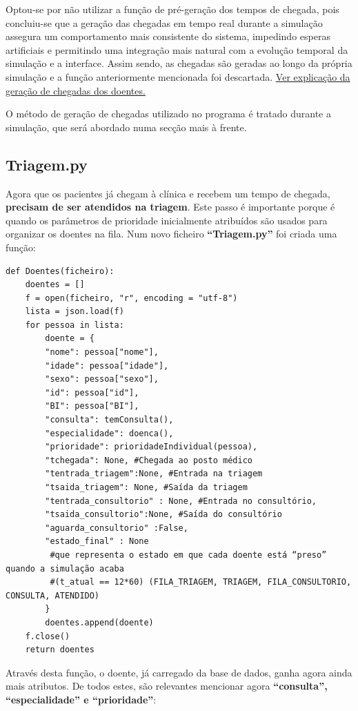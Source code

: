 \documentclass[12pt,a4paper]{article} %
\begin{document}
    \medskip
    Optou-se por não utilizar a função de pré-geração dos tempos de chegada, pois concluiu-se que a geração das chegadas em tempo real durante a simulação assegura um comportamento mais consistente do sistema, impedindo esperas artificiais e permitindo uma integração mais natural com a evolução temporal da simulação e a interface. Assim sendo, as chegadas são geradas ao longo da própria simulação e a função anteriormente mencionada foi descartada.  \hyperlink{geracao_chegadas}{Ver explicação da geração de chegadas dos doentes.}

    \medskip
    O método de geração de chegadas utilizado no programa é tratado durante a simulação, que será abordado numa secção mais à frente.
    
    \subsection{Triagem.py}
    
        Agora que os pacientes já chegam à clínica e recebem um tempo de chegada, \textbf{precisam de ser atendidos na triagem}. Este passo é importante porque é quando os parâmetros de prioridade inicialmente atribuídos são usados para organizar os doentes na fila. Num novo ficheiro \textbf{“Triagem.py”} foi criada uma função: 
        
\begin{verbatim}
def Doentes(ficheiro):
    doentes = []
    f = open(ficheiro, "r", encoding = "utf-8")
    lista = json.load(f)
    for pessoa in lista:
        doente = {
        "nome": pessoa["nome"],
        "idade": pessoa["idade"],
        "sexo": pessoa["sexo"],
        "id": pessoa["id"],
        "BI": pessoa["BI"],
        "consulta": temConsulta(),
        "especialidade": doenca(),
        "prioridade": prioridadeIndividual(pessoa),
        "tchegada": None, #Chegada ao posto médico
        "tentrada_triagem":None, #Entrada na triagem
        "tsaida_triagem": None, #Saída da triagem
        "tentrada_consultorio" : None, #Entrada no consultório,
        "tsaida_consultorio":None, #Saída do consultório
        "aguarda_consultorio" :False,
     	"estado_final" : None 
         #que representa o estado em que cada doente está “preso” quando a simulação acaba 
         #(t_atual == 12*60) (FILA_TRIAGEM, TRIAGEM, FILA_CONSULTORIO, CONSULTA, ATENDIDO)
        }
        doentes.append(doente)
    f.close()
    return doentes
\end{verbatim}

    Através desta função, o doente, já carregado da base de dados, ganha agora ainda mais atributos. De todos estes, são relevantes mencionar agora \textbf{“consulta”, “especialidade” e “prioridade”}:
\end{document}
